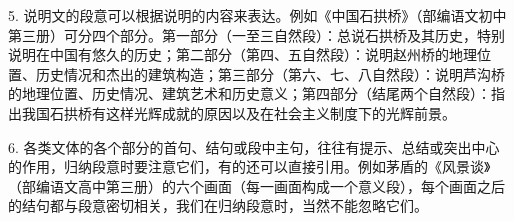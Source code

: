5. 说明文的段意可以根据说明的内容来表达。例如《中国石拱桥》（部编语文初中第三册）可分四个部分。第一部分（一至三自然段）：总说石拱桥及其历史，特别说明在中国有悠久的历史；第二部分（第四、五自然段）：说明赵州桥的地理位置、历史情况和杰出的建筑构造；第三部分（第六、七、八自然段）：说明芦沟桥的地理位置、历史情况、建筑艺术和历史意义；第四部分（结尾两个自然段）：指出我国石拱桥有这样光辉成就的原因以及在社会主义制度下的光辉前景。

6. 各类文体的各个部分的首句、结句或段中主句，往往有提示、总结或突出中心的作用，归纳段意时要注意它们，有的还可以直接引用。例如茅盾的《风景谈》（部编语文高中第三册）的六个画面（每一画面构成一个意义段），每个画面之后的结句都与段意密切相关，我们在归纳段意时，当然不能忽略它们。
\newpage